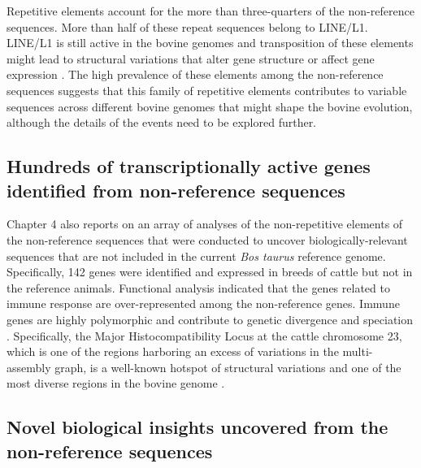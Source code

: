 \documentclass[../main.tex]{subfiles}
\begin{document}
Repetitive elements account for the more than three-quarters of the non-reference sequences. More than half of these repeat sequences belong to LINE/L1. LINE/L1 is still active in the bovine genomes and transposition of these elements might lead to structural variations that alter gene structure or affect gene expression \citep{adelson2009characterization,beck2011line,chen2017detection}. The high prevalence of these elements among the non-reference sequences suggests that this family of repetitive elements contributes to variable sequences across different bovine genomes that might shape the bovine evolution, although the details of the events need to be explored further.

\subsection*{Hundreds of transcriptionally active genes identified from non-reference sequences}

Chapter 4 also reports on an array of analyses of the non-repetitive elements of the non-reference sequences that were conducted to uncover biologically-relevant sequences that are not included in the current \emph{Bos taurus} reference genome. Specifically, 142 genes were identified and expressed in breeds of cattle but not in the reference animals. Functional analysis indicated that the genes related to immune response are over-represented among the non-reference genes. Immune genes are highly polymorphic and contribute to genetic divergence and speciation \citep{chen2019large}. Specifically, the Major Histocompatibility Locus at the cattle chromosome 23, which is one of the regions harboring an excess of variations in the multi-assembly graph, is a well-known hotspot of structural variations and one of the most diverse regions in the bovine genome \citep{Hu2020}. 

\subsection*{Novel biological insights uncovered from the non-reference sequences}
\end{document}
